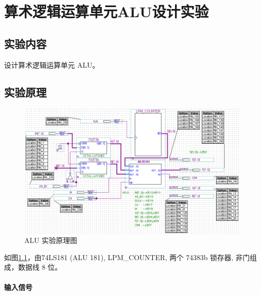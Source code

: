 \chapter{算术逻辑运算单元ALU设计实验}
\section{实验内容}

设计算术逻辑运算单元 ALU。

\section{实验原理}

\begin{figure}[H]
\centering
\includegraphics[width=\textwidth]{images/prin3.png}
\caption{ALU 实验原理图}
\label{fig:prin3}
\end{figure}

如图\ref{fig:prin3}，由74LS181 (ALU 181), LPM\_COUNTER, 两个 74383b 锁存器, 非门组成，数据线 8 位。

\subsubsection{输入信号}

